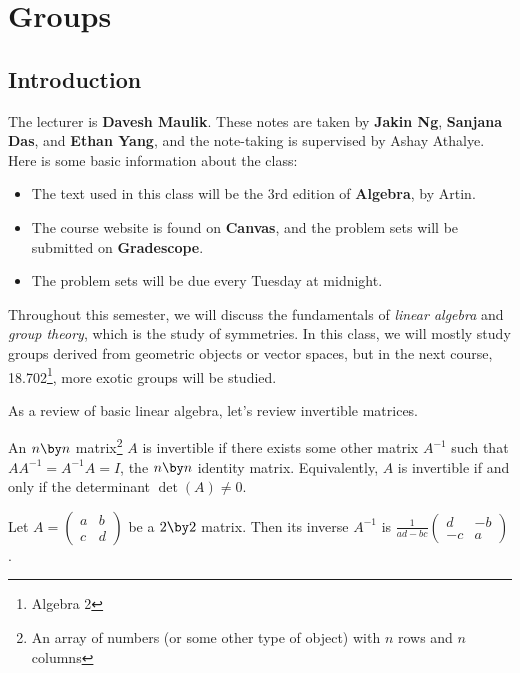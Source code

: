
\section{Groups}
\subsection{Introduction}
The lecturer is \textbf{Davesh Maulik}. These notes are taken by \textbf{Jakin Ng}, \textbf{Sanjana Das}, and \textbf{Ethan Yang}, and
the note-taking is supervised by Ashay Athalye. Here is some basic information about the class:
\begin{itemize}
    \item The text used in this class will be the 3rd edition of \textbf{Algebra}, by Artin.

    \item The course website is found on \textbf{Canvas}, and the problem sets will be submitted on \textbf{Gradescope}.

    \item The problem sets will be due every Tuesday at midnight.
\end{itemize}

Throughout this semester, we will discuss the fundamentals of \emph{linear algebra} and \emph{group theory}, which is the study of symmetries. In this class, we will mostly study groups derived from geometric objects or vector spaces, but in the next course, 18.702\footnote{Algebra 2}, more exotic groups will be studied.

As a review of basic linear algebra, let's review invertible matrices.

\begin{definition}
An $n \by n$ matrix\footnote{An array of numbers (or some other type of object) with $n$ rows and $n$ columns} $A$ is invertible if there exists some other matrix $A^{-1}$ such that $AA^{-1} = A^{-1}A = I$, the $n \by n$ identity matrix. Equivalently, $A$ is invertible if and only if the determinant $\det(A) \neq 0.$
\end{definition}

\begin{example}[$n = 2$]
Let $A = \begin{pmatrix}a & b \\ c & d\end{pmatrix}$ be a $2 \by 2$ matrix. Then its inverse $A^{-1}$ is $\frac{1}{ad-bc}\begin{pmatrix}
d & -b \\ -c & a
\end{pmatrix}$.
\end{example}

